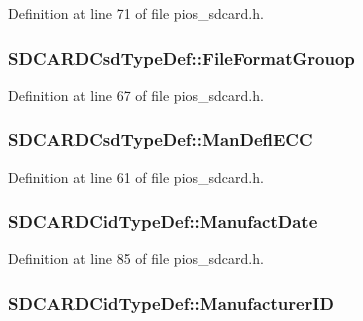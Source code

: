Definition at line 71 of file pios\-\_\-sdcard.\-h.

\hypertarget{group___p_i_o_s___s_d_c_a_r_d_ga19785f76dae23ac16c7af85cc6c88460}{
\subsubsection[{File\-Format\-Grouop}]{ S\-D\-C\-A\-R\-D\-Csd\-Type\-Def\-::\-File\-Format\-Grouop}}\label{group___p_i_o_s___s_d_c_a_r_d_ga19785f76dae23ac16c7af85cc6c88460}


Definition at line 67 of file pios\-\_\-sdcard.\-h.

\hypertarget{group___p_i_o_s___s_d_c_a_r_d_ga638d0d0306f38092eba2d405639c2099}{
\subsubsection[{Man\-Defl\-E\-C\-C}]{ S\-D\-C\-A\-R\-D\-Csd\-Type\-Def\-::\-Man\-Defl\-E\-C\-C}}\label{group___p_i_o_s___s_d_c_a_r_d_ga638d0d0306f38092eba2d405639c2099}


Definition at line 61 of file pios\-\_\-sdcard.\-h.

\hypertarget{group___p_i_o_s___s_d_c_a_r_d_gae7c9d488577977c2c5c2baca30ca6cec}{
\subsubsection[{Manufact\-Date}]{ S\-D\-C\-A\-R\-D\-Cid\-Type\-Def\-::\-Manufact\-Date}}\label{group___p_i_o_s___s_d_c_a_r_d_gae7c9d488577977c2c5c2baca30ca6cec}


Definition at line 85 of file pios\-\_\-sdcard.\-h.

\hypertarget{group___p_i_o_s___s_d_c_a_r_d_ga083dff8fb19fcec5bf79ab18c105b6c3}{
\subsubsection[{Manufacturer\-I\-D}]{ S\-D\-C\-A\-R\-D\-Cid\-Type\-Def\-::\-Manufacturer\-I\-D}}\label{group___p_i_o_s___s_d_c_a_r_d_ga083dff8fb19fcec5bf79ab18c105b6c3}


